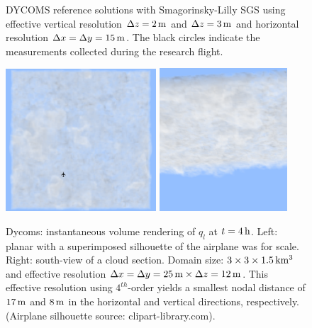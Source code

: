 \documentclass{report}
\begin{document}
\begin{figure}
    \caption{DYCOMS reference solutions with  Smagorinsky-Lilly SGS using effective vertical resolution $\Delta z=2\,{\rm m}$ and $\Delta z=3\,{\rm m}$ and horizontal resolution $\Delta x=\Delta y=15\,{\rm m}$. The black circles indicate the measurements collected during the research flight.}
\label{fig:dycomsWWresultLSRK14-smago}
\end{figure}


\begin{figure}
    \centering
        \includegraphics[width=0.5\textwidth]{./figures/benchmarks/dycoms/cloud_b747.png}
		\includegraphics[width=0.425\textwidth]{./figures/benchmarks/dycoms/dycoms-view-below-angle.png}
	\caption{Dycoms: instantaneous volume rendering of $q_l$ at $t=4\,{\rm h}$. Left: planar with a superimposed silhouette of the airplane was for scale. Right: south-view of a cloud section. Domain size: $3 \times 3 \times 1.5\,{\rm km^3}$ and effective resolution $\Delta x = \Delta y = 25\,{\rm m} \times \Delta z = 12\,{\rm m}$. This effective resolution using $4^{th}$-order  yields a smallest nodal distance of $17\,{\rm m}$ and $8\,{\rm m}$ in the horizontal and vertical directions, respectively.  (Airplane silhouette source: clipart-library.com).}
	\label{fig:DYCOMS_ql_rendering}
\end{figure}
\end{document}
